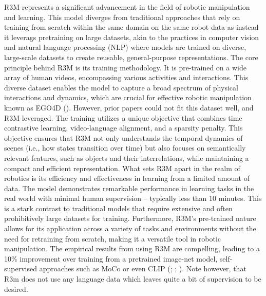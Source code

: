 \documentclass[
  letterpaper,
  numbers=noenddot,
  DIV=11]{scrreprt}
\theoremstyle{plain}
\theoremstyle{definition}
\theoremstyle{remark}
\begin{document}
R3M represents a significant advancement in the field of robotic
manipulation and learning. This model diverges from traditional
approaches that rely on training from scratch within the same domain on
the same robot data as instead it leverags pretraining on large
datasets, akin to the practices in computer vision and natural language
processing (NLP) where models are trained on diverse, large-scale
datasets to create reusable, general-purpose representations. The core
principle behind R3M is its training methodology. It is pre-trained on a
wide array of human videos, encompassing various activities and
interactions. This diverse dataset enables the model to capture a broad
spectrum of physical interactions and dynamics, which are crucial for
effective robotic manipulation known as EGO4D
(). However, prior
papers could not fit this dataset well, and R3M leveraged. The training
utilizes a unique objective that combines time contrastive learning,
video-language alignment, and a sparsity penalty. This objective ensures
that R3M not only understands the temporal dynamics of scenes (i.e., how
states transition over time) but also focuses on semantically relevant
features, such as objects and their interrelations, while maintaining a
compact and efficient representation. What sets R3M apart in the realm
of robotics is its efficiency and effectiveness in learning from a
limited amount of data. The model demonstrates remarkable performance in
learning tasks in the real world with minimal human supervision --
typically less than 10 minutes. This is a stark contrast to traditional
models that require extensive and often prohibitively large datasets for
training. Furthermore, R3M's pre-trained nature allows for its
application across a variety of tasks and environments without the need
for retraining from scratch, making it a versatile tool in robotic
manipulation. The empirical results from using R3M are compelling,
leading to a 10\% improvement over training from a pretrained image-net
model, self-supervised approaches such as MoCo or even CLIP
(;
;
). Note however,
that R3m does not use any language data which leaves quite a bit of
supervision to be desired.
\end{document}
